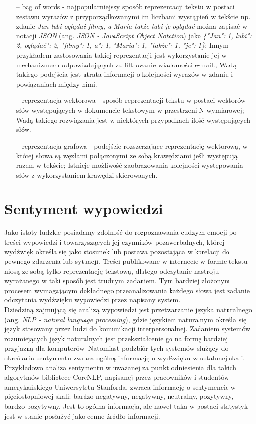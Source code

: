\begin{itemize}
	\item[--] bag of words - najpopularniejszy sposób reprezentacji tekstu w postaci zestawu wyrazów z przyporządkowanymi im liczbami wystąpień w tekście np. zdanie \textit{Jan lubi oglądać filmy, a Maria także lubi je oglądać} można zapisać w notacji \textit{JSON} (ang. \textit{JSON - JavaScript Object Notation}) jako \textit{\{"Jan": 1, \textquotesingle \textquotesingle lubi": 2, \textquotesingle \textquotesingle oglądać": 2, "filmy": 1, \textquotesingle \textquotesingle a": 1, "Maria": 1, "także": 1, "je": 1\}}; Innym przykładem zastosowania takiej reprezentacji jest wykorzystanie jej w mechanizmach odpowiadających za filtrowanie wiadomości e-mail.; Wadą takiego podejścia jest utrata informacji o kolejności wyrazów w zdaniu i powiązaniach między nimi.
	\item[--] reprezentacja wektorowa - sposób reprezentacji tekstu w postaci wektorów słów występujących w dokumencie tekstowym w przestrzeni N-wymiarowej; Wadą takiego rozwiązania jest w niektórych przypadkach ilość występujących słów.
	\item[--] reprezentacja grafowa - podejście rozszerzające reprezentację wektorową, w której słowa są węzłami połączonymi ze sobą krawędziami jeśli występują razem w tekście; Istnieje możliwość zaobrazowania kolejności występowania słów z wykorzystaniem krawędzi skierowanych.
\end{itemize}

\section{Sentyment wypowiedzi}
Jako istoty ludzkie posiadamy zdolność do rozpoznawania cudzych emocji po treści wypowiedzi i towarzyszących jej czynników pozawerbalnych, której wydźwięk określa się jako stosunek lub postawa pozostająca w korelacji do pewnego zdarzenia lub sytuacji. Treści publikowane w internecie w formie tekstu niosą ze sobą tylko reprezentację tekstową, dlatego odczytanie nastroju wyrażanego w taki sposób jest trudnym zadaniem. Tym bardziej złożonym procesem wymagającym dokładnego przeanalizowania każdego słowa jest zadanie odczytania wydźwięku wypowiedzi przez napisany system. \\
Dziedziną zajmującą się analizą wypowiedzi jest przetwarzanie języka naturalnego (ang. \textit{NLP - natural language processing}), gdzie językiem naturalnym określa się język stosowany przez ludzi do komunikacji interpersonalnej. Zadaniem systemów rozumiejących język naturalnych jest przekształcenie go na formę bardziej przyjazną dla komputerów. Natomiast podzbiór tych systemów służący do określania sentymentu zwraca ogólną informację o wydźwięku w ustalonej skali. Przykładowo analiza sentymentu w uważanej za punkt odniesienia dla takich algorytmów bibliotece CoreNLP, napisanej przez pracowników i studentów amerykańskiego Uniwersytetu Stanforda, zwraca informację o sentymencie w pięciostopniowej skali: bardzo negatywny, negatywny, neutralny, pozytywny, bardzo pozytywny. Jest to ogólna informacja, ale nawet taka w postaci statystyk jest w stanie posłużyć jako cenne źródło informacji.

